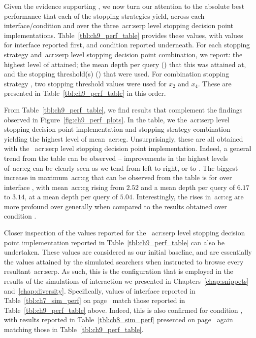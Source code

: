 Given the evidence supporting , we now turn our attention to the absolute best performance that each of the stopping strategies yield, across each interface/condition and over the three~\gls{acr:serp} level stopping decision point implementations. Table~\ref{tbl:ch9_perf_table} provides these values, with values for interface  reported first, and condition  reported underneath. For each stopping strategy and~\gls{acr:serp} level stopping decision point combination, we report: the highest level of  attained; the mean depth per query () that this was attained at, and the stopping threshold(s) () that were used. For combination stopping strategy , two stopping threshold values were used for $x_2$ and $x_4$. These are presented in Table~\ref{tbl:ch9_perf_table} in this order.

From Table~\ref{tbl:ch9_perf_table}, we find results that complement the findings observed in Figure~\ref{fig:ch9_perf_plots}. In the table, we  the~\gls{acr:serp} level stopping decision point implementation and stopping strategy combination yielding the highest level of mean~\gls{acr:cg}. Unsurprisingly, these are all obtained with the ~\gls{acr:serp} level stopping decision point implementation. Indeed, a general trend from the table can be observed -- improvements in the highest levels of~\gls{acr:cg} can be clearly seen as we tend from left to right, or  to . The biggest increase in maximum~\gls{acr:cg} that can be observed from the table is for  over interface , with mean~\gls{acr:cg} rising from $2.52$ and a mean depth per query of $6.17$ to $3.14$, at a mean depth per query of $5.04$. Interestingly, the rises in~\gls{acr:cg} are more profound over  generally when compared to the results obtained over condition .

Closer inspection of the values reported for the ~\gls{acr:serp} level stopping decision point implementation reported in Table~\ref{tbl:ch9_perf_table} can also be undertaken. These values are considered as our initial baseline, and are essentially the values attained by the simulated searchers when instructed to browse every resultant~\gls{acr:serp}. As such, this is the configuration that is employed in the results of the simulations of interaction we presented in Chapters~\ref{chap:snippets} and~\ref{chap:diversity}. Specifically, values of interface  reported in Table~\ref{tbl:ch7_sim_perf} on page~\pageref{tbl:ch7_sim_perf} match those reported in Table~\ref{tbl:ch9_perf_table} above. Indeed, this is also confirmed for condition , with results reported in Table~\ref{tbl:ch8_sim_perf} presented on page~\pageref{tbl:ch8_sim_perf} again matching those in Table~\ref{tbl:ch9_perf_table}.

